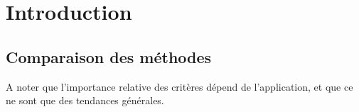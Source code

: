 \chapter{Introduction}

\section{Comparaison des méthodes}
	

A noter que l'importance relative des critères dépend de l'application, et que ce ne sont que des tendances générales.
